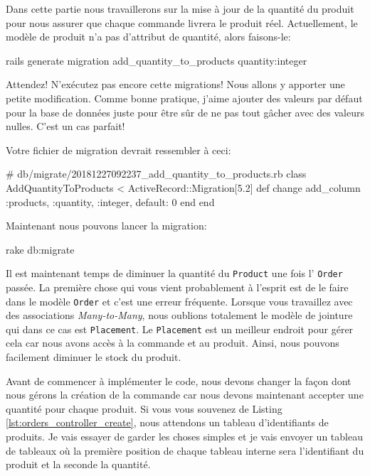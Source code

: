 \documentclass[]{report}
\begin{document}
    Dans cette partie nous travaillerons sur la mise à jour de la quantité du produit pour nous assurer que chaque commande livrera le produit réel. Actuellement, le modèle de produit n'a pas d'attribut de quantité, alors faisons-le:

    \begin{bashcode}
    rails generate migration add_quantity_to_products quantity:integer
    \end{bashcode}

    Attendez! N'exécutez pas encore cette migrations! Nous allons y apporter une petite modification. Comme bonne pratique, j'aime ajouter des valeurs par défaut pour la base de données juste pour être sûr de ne pas tout gâcher avec des valeurs nulles. C'est un cas parfait!

    Votre fichier de migration devrait ressembler à ceci:

    \begin{rubycode}
    # db/migrate/20181227092237_add_quantity_to_products.rb
    class AddQuantityToProducts < ActiveRecord::Migration[5.2]
      def change
        add_column :products, :quantity, :integer, default: 0
      end
    end
    \end{rubycode}

    Maintenant nous pouvons lancer la migration:

    \begin{bashcode}
    rake db:migrate
    \end{bashcode}

    Il est maintenant temps de diminuer la quantité du \verb|Product| une fois l' \verb|Order| passée. La première chose qui vous vient probablement à l'esprit est de le faire dans le modèle \verb|Order| et c'est une erreur fréquente. Lorsque vous travaillez avec des associations \textit{Many-to-Many}, nous oublions totalement le modèle de jointure qui dans ce cas est \verb|Placement|. Le \verb|Placement| est un meilleur endroit pour gérer cela car nous avons accès à la commande et au produit. Ainsi, nous pouvons facilement diminuer le stock du produit.

    Avant de commencer à implémenter le code, nous devons changer la façon dont nous gérons la création de la commande car nous devons maintenant accepter une quantité pour chaque produit. Si vous vous souvenez de Listing \ref{lst:orders_controller_create}, nous attendons un tableau d'identifiants de produits. Je vais essayer de garder les choses simples et je vais envoyer un tableau de tableaux où la première position de chaque tableau interne sera l'identifiant du produit et la seconde la quantité.
\end{document}
